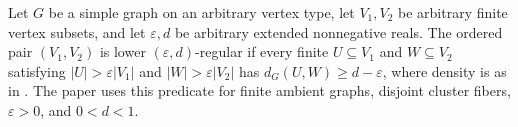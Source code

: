 \begin{definition}
Let $G$ be a simple graph on an arbitrary vertex type, let $V_1,V_2$ be arbitrary finite vertex subsets, and let $\varepsilon,d$ be arbitrary extended nonnegative reals.  The ordered pair $(V_1,V_2)$ is lower $(\varepsilon,d)$-regular if every finite $U\subseteq V_1$ and $W\subseteq V_2$ satisfying $|U|>\varepsilon|V_1|$ and $|W|>\varepsilon|V_2|$ has $d_G(U,W)\geq d-\varepsilon$, where density is as in .  The paper uses this predicate for finite ambient graphs, disjoint cluster fibers, $\varepsilon>0$, and $0<d<1$.
\end{definition}
